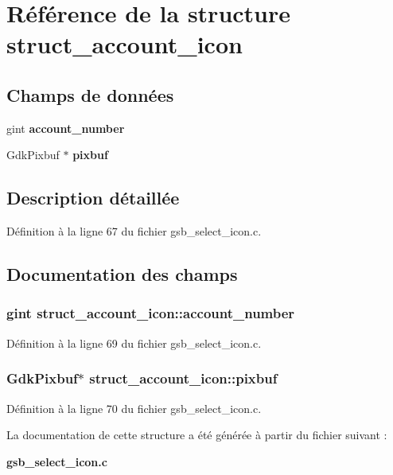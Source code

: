 \section{Référence de la structure struct\_\-account\_\-icon}
\label{structstruct__account__icon}
\subsection*{Champs de données}
\begin{DoxyCompactItemize}
\item 
gint {\bf account\_\-number}
\item 
GdkPixbuf $\ast$ {\bf pixbuf}
\end{DoxyCompactItemize}


\subsection{Description détaillée}


Définition à la ligne 67 du fichier gsb\_\-select\_\-icon.c.



\subsection{Documentation des champs}
\subsubsection[{account\_\-number}]{\setlength{\rightskip}{0pt plus 5cm}gint {\bf struct\_\-account\_\-icon::account\_\-number}}\label{structstruct__account__icon_aa20cb4501bd56854abea64caf3c31459}


Définition à la ligne 69 du fichier gsb\_\-select\_\-icon.c.

\subsubsection[{pixbuf}]{\setlength{\rightskip}{0pt plus 5cm}GdkPixbuf$\ast$ {\bf struct\_\-account\_\-icon::pixbuf}}\label{structstruct__account__icon_af1b189b22f2ef89a3262f94b60b5e407}


Définition à la ligne 70 du fichier gsb\_\-select\_\-icon.c.



La documentation de cette structure a été générée à partir du fichier suivant :\begin{DoxyCompactItemize}
\item 
{\bf gsb\_\-select\_\-icon.c}\end{DoxyCompactItemize}
